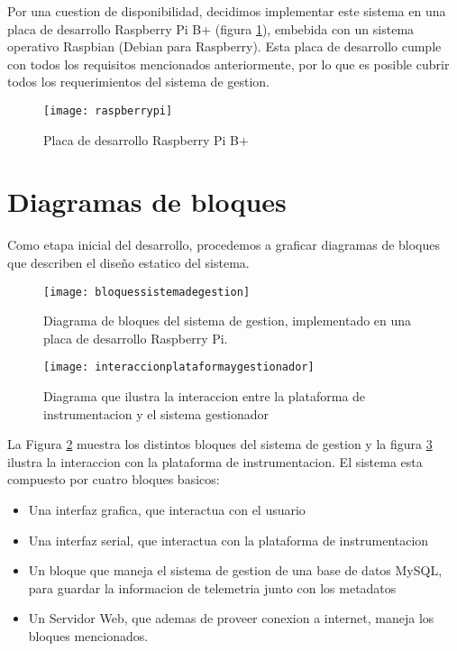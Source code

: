 Por una cuestion de disponibilidad, decidimos implementar este sistema en una placa de desarrollo Raspberry Pi B+ (figura \ref{fig:raspberrypi}), embebida con un sistema operativo Raspbian (Debian para Raspberry). Esta placa de desarrollo cumple con todos los requisitos mencionados anteriormente, por lo que es posible cubrir todos los requerimientos del sistema de gestion.

\begin{figure}[h]
  \centering
  \texttt{[image: raspberrypi]}
  \caption{Placa de desarrollo Raspberry Pi B+}\label{fig:raspberrypi}
\end{figure}

\section{Diagramas de bloques} %
\label{sec:diagramas_de_bloques}

Como etapa inicial del desarrollo, procedemos a graficar diagramas de bloques que describen el diseño estatico del sistema.

\begin{figure}[h]
  \centering
  \texttt{[image: bloquessistemadegestion]}
  \caption{Diagrama de bloques del sistema de gestion, implementado en una placa de desarrollo Raspberry Pi.}\label{fig:bloquessistemadegestion}
\end{figure}

\begin{figure}[h]
  \centering
  \texttt{[image: interaccionplataformaygestionador]}
  \caption{Diagrama que ilustra la interaccion entre la plataforma de instrumentacion y el sistema gestionador}\label{fig:interaccionplataformaygestionador}
\end{figure}

La Figura \ref{fig:bloquessistemadegestion} muestra los distintos bloques del sistema de gestion y la figura \ref{fig:interaccionplataformaygestionador} ilustra la interaccion con la plataforma de instrumentacion. El sistema esta compuesto por cuatro bloques basicos:

\begin{itemize}
	\item Una interfaz grafica, que interactua con el usuario
	\item Una interfaz serial, que interactua con la plataforma de instrumentacion
	\item Un bloque que maneja el sistema de gestion de una base de datos MySQL, para guardar la informacion de telemetria junto con los metadatos
	\item Un Servidor Web, que ademas de proveer conexion a internet, maneja los bloques mencionados.
\end{itemize}


